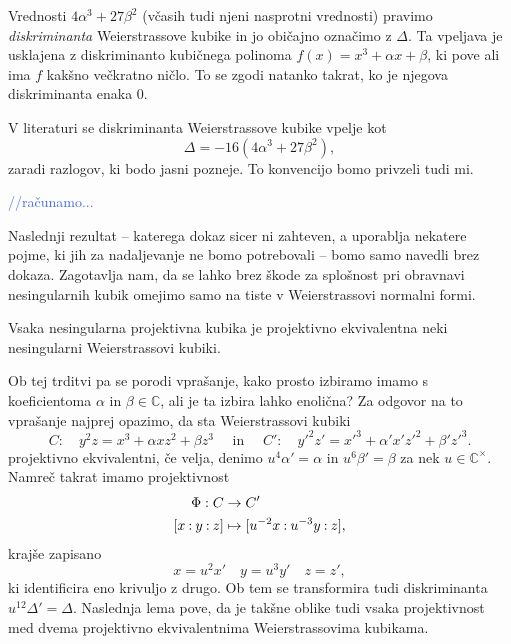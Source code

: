 \documentclass[mat1]{fmfdelo}
\newcommand{\C}{\mathbb C}
\newcommand{\CM}{\mathbb C ^\times}
\newcommand{\pcoor}[1]{%
  \begingroup\lccode`~=`: \lowercase{\endgroup
  \edef~}{\mathbin{\mathchar\the\mathcode`:}\nobreak}%
  [%
  \begingroup
  \mathcode`:=\string"8000
  #1%
  \endgroup
  ]%
}
\newcommand{\kom}[1]{
    \textcolor{RoyalBlue}{//#1}
}
\theoremstyle{definition}
\begin{document}
\begin{opomba}
    Vrednosti $4\alpha^3 + 27\beta^2$ (včasih tudi njeni nasprotni vrednosti) pravimo \emph{diskriminanta} Weierstrassove kubike in jo običajno označimo z $\Delta$. Ta vpeljava je usklajena z diskriminanto kubičnega polinoma $f(x) = x^3 + \alpha x + \beta$, ki pove ali ima $f$ kakšno večkratno ničlo. To se zgodi natanko takrat, ko je njegova diskriminanta enaka $0$. 
    
    V literaturi se diskriminanta Weierstrassove kubike vpelje kot
    \[
        \Delta = -16(4\alpha^3 + 27\beta^2),
    \]
    zaradi razlogov, ki bodo jasni pozneje. To konvencijo bomo privzeli tudi mi.
\end{opomba}

\begin{dokaz}
    \kom{računamo...}
\end{dokaz}


Naslednji rezultat -- katerega dokaz sicer ni zahteven, a uporablja nekatere pojme, ki jih za nadaljevanje ne bomo potrebovali -- bomo samo navedli brez dokaza. Zagotavlja nam, da se lahko brez škode za splošnost pri obravnavi nesingularnih kubik omejimo samo na tiste v Weierstrassovi normalni formi. 



\begin{trditev}
    \label{kubika izomorfna neki wnf}
    Vsaka nesingularna projektivna kubika je projektivno ekvivalentna neki nesingularni Weierstrassovi kubiki.  
\end{trditev}

\begin{dokaz}
    \cite[lemma 15.2]{Gibson}
\end{dokaz}

Ob tej trditvi pa se porodi vprašanje, kako prosto izbiramo imamo s koeficientoma $\alpha$ in $\beta \in \C$, ali je ta izbira lahko enolična? Za odgovor na to vprašanje najprej opazimo, da sta Weierstrassovi kubiki 
\[
    C: \quad y^2z = x^3 + \alpha xz^2 + \beta z^3 \quad \text{ in } \quad
    C': \quad y'^2z' = x'^3 + \alpha' x'z'^2 + \beta' z'^3. 
\]
projektivno ekvivalentni, če velja, denimo $u^4 \alpha' = \alpha$ in $u^6 \beta' = \beta$ za nek $u \in \CM$. Namreč takrat imamo projektivnost
\begin{align*}
    \Phi:C &\to C'\\
    \pcoor{x : y : z} &\mapsto \pcoor{u^{-2}x : u^{-3}y : z},
\end{align*}
krajše zapisano 
\[
    x = u^2 x' \quad y = u^3 y' \quad z = z',  
\]
ki identificira eno krivuljo z drugo. Ob tem se transformira tudi diskriminanta $u^{12} \Delta' = \Delta$. Naslednja lema pove, da je takšne oblike tudi vsaka projektivnost med dvema projektivno ekvivalentnima Weierstrassovima kubikama. 
        
\end{document}
